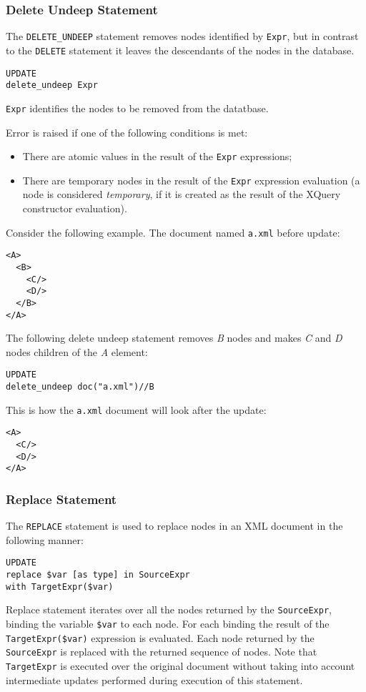 \documentclass[a4paper,12pt]{article}
\begin{document}
\subsubsection*{Delete Undeep Statement}
The \verb!DELETE_UNDEEP! statement removes nodes identified by \verb!Expr!, but
in contrast to the \verb!DELETE! statement it leaves the descendants of the
nodes in the database.

\begin{verbatim}
UPDATE
delete_undeep Expr
\end{verbatim}
\verb!Expr! identifies the nodes to be removed from the datatbase.

Error is raised if one of the following conditions is met:
\begin{itemize}
\item There are atomic values in the result of the \verb!Expr! expressions;
\item There are temporary nodes in the result of the \verb!Expr! expression
evaluation (a node is considered \emph{temporary}, if it is created as the
result of the XQuery constructor evaluation).
\end{itemize}

Consider the following example. The document named \verb!a.xml! before update:
\begin{verbatim}
<A>
  <B>
    <C/>
    <D/>
  </B>
</A>
\end{verbatim}
The following delete undeep statement removes \emph{B} nodes and makes \emph{C}
and \emph{D} nodes children of the \emph{A} element:
\begin{verbatim}
UPDATE
delete_undeep doc("a.xml")//B
\end{verbatim}
This is how the \verb!a.xml! document will look after the update:
\begin{verbatim}
<A>
  <C/>
  <D/>
</A>
\end{verbatim}


\subsubsection*{Replace Statement}
The \verb!REPLACE! statement is used to replace nodes in an XML document in the
following manner: 

\begin{verbatim}
UPDATE
replace $var [as type] in SourceExpr
with TargetExpr($var)
\end{verbatim}
Replace statement iterates over all the nodes returned by the \verb!SourceExpr!,
binding the variable \verb!$var! to each node. For each binding the result of
the \verb!TargetExpr($var)! expression is evaluated. Each node returned by the
\verb!SourceExpr! is replaced with the returned sequence of nodes. Note that
\verb!TargetExpr! is executed over the original document without taking into
account intermediate updates performed during execution of this statement.
\end{document}
